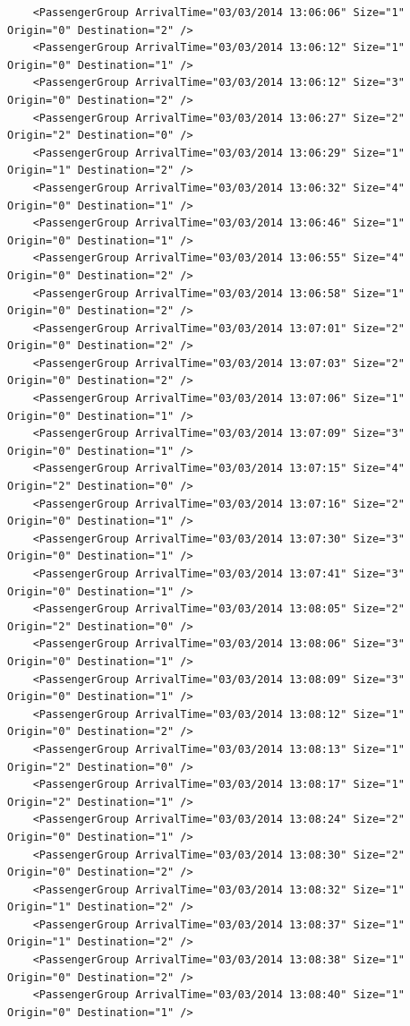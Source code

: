 \documentclass{UoYCSproject}
\begin{document}
\begin{appendices}
\begin{lstlisting}
	<PassengerGroup ArrivalTime="03/03/2014 13:06:06" Size="1" Origin="0" Destination="2" />
	<PassengerGroup ArrivalTime="03/03/2014 13:06:12" Size="1" Origin="0" Destination="1" />
	<PassengerGroup ArrivalTime="03/03/2014 13:06:12" Size="3" Origin="0" Destination="2" />
	<PassengerGroup ArrivalTime="03/03/2014 13:06:27" Size="2" Origin="2" Destination="0" />
	<PassengerGroup ArrivalTime="03/03/2014 13:06:29" Size="1" Origin="1" Destination="2" />
	<PassengerGroup ArrivalTime="03/03/2014 13:06:32" Size="4" Origin="0" Destination="1" />
	<PassengerGroup ArrivalTime="03/03/2014 13:06:46" Size="1" Origin="0" Destination="1" />
	<PassengerGroup ArrivalTime="03/03/2014 13:06:55" Size="4" Origin="0" Destination="2" />
	<PassengerGroup ArrivalTime="03/03/2014 13:06:58" Size="1" Origin="0" Destination="2" />
	<PassengerGroup ArrivalTime="03/03/2014 13:07:01" Size="2" Origin="0" Destination="2" />
	<PassengerGroup ArrivalTime="03/03/2014 13:07:03" Size="2" Origin="0" Destination="2" />
	<PassengerGroup ArrivalTime="03/03/2014 13:07:06" Size="1" Origin="0" Destination="1" />
	<PassengerGroup ArrivalTime="03/03/2014 13:07:09" Size="3" Origin="0" Destination="1" />
	<PassengerGroup ArrivalTime="03/03/2014 13:07:15" Size="4" Origin="2" Destination="0" />
	<PassengerGroup ArrivalTime="03/03/2014 13:07:16" Size="2" Origin="0" Destination="1" />
	<PassengerGroup ArrivalTime="03/03/2014 13:07:30" Size="3" Origin="0" Destination="1" />
	<PassengerGroup ArrivalTime="03/03/2014 13:07:41" Size="3" Origin="0" Destination="1" />
	<PassengerGroup ArrivalTime="03/03/2014 13:08:05" Size="2" Origin="2" Destination="0" />
	<PassengerGroup ArrivalTime="03/03/2014 13:08:06" Size="3" Origin="0" Destination="1" />
	<PassengerGroup ArrivalTime="03/03/2014 13:08:09" Size="3" Origin="0" Destination="1" />
	<PassengerGroup ArrivalTime="03/03/2014 13:08:12" Size="1" Origin="0" Destination="2" />
	<PassengerGroup ArrivalTime="03/03/2014 13:08:13" Size="1" Origin="2" Destination="0" />
	<PassengerGroup ArrivalTime="03/03/2014 13:08:17" Size="1" Origin="2" Destination="1" />
	<PassengerGroup ArrivalTime="03/03/2014 13:08:24" Size="2" Origin="0" Destination="1" />
	<PassengerGroup ArrivalTime="03/03/2014 13:08:30" Size="2" Origin="0" Destination="2" />
	<PassengerGroup ArrivalTime="03/03/2014 13:08:32" Size="1" Origin="1" Destination="2" />
	<PassengerGroup ArrivalTime="03/03/2014 13:08:37" Size="1" Origin="1" Destination="2" />
	<PassengerGroup ArrivalTime="03/03/2014 13:08:38" Size="1" Origin="0" Destination="2" />
	<PassengerGroup ArrivalTime="03/03/2014 13:08:40" Size="1" Origin="0" Destination="1" />

\end{lstlisting}
\end{appendices}
\end{document}
